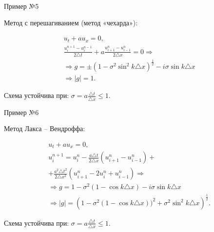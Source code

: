 \documentclass[12pt,xcolor=pst,aspectratio=169]{beamer}
\begin{document}
\begin{frame}{Пример №5}

	\transdissolve[duration=0.1]
	\justifying
	\large

	Метод с перешагиванием (метод «чехарда»):

	\[
		\begin{split}
			&u_{t} + a u_{x} = 0 , \\
			&\frac{u^{n + 1}_{i} - u^{n - 1}_{i}}{2 \triangle t} + a \frac{u^{n}_{i + 1} - u^{n}_{i - 1}}{2 \triangle x} = 0 \Rightarrow \\
			& \Rightarrow g = \pm (1 - \sigma^{2} \sin^{2} k \triangle x)^{\frac{1}{2}} - i \sigma \sin k \triangle x \\
			& \Rightarrow |g| = 1 .
		\end{split}
	\]

    Схема устойчива при: $\sigma = a \frac{\triangle t}{\triangle x} \leq 1$.\\

\end{frame}

\begin{frame}{Пример №6}

	\transdissolve[duration=0.1]
	\justifying
	\large

	Метод Лакса -- Вендроффа:

	\[
		\begin{split}
			&u_{t} + a u_{x} = 0 , \\
			&u^{n + 1}_{i} = u^{n}_{i} - \frac{a \triangle t}{2 \triangle x} (u^{n}_{i + 1} - u^{n}_{i - 1}) + \\
			& + \frac{a^{2} \triangle t^{2}}{2 \triangle x^{2}} (u^{n}_{i + 1} - 2 u^{n}_{i} + u^{n}_{i - 1}) \Rightarrow \\
			& \Rightarrow g = 1 - \sigma^{2} (1 - \cos k \triangle x) - i \sigma \sin k \triangle x \\
			& \Rightarrow |g| = \left( 1 - \sigma^{2} (1 - \cos k \triangle x))^2 + \sigma^{2} \sin^{2} k \triangle x \right)^{\frac{1}{2}} .
		\end{split}
	\]

    Схема устойчива при: $\sigma = a \frac{\triangle t}{\triangle x} \leq 1$.\\

\end{frame}
\end{document}
